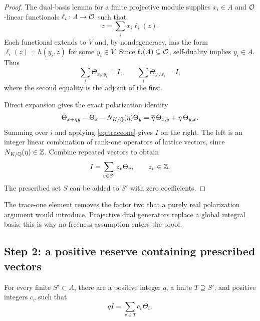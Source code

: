 \begin{proof}
The dual-basis lemma for a finite projective module supplies $x_i\in A$ and $\mathcal O$-linear functionals $\ell_i:A\to\mathcal O$ such that
\[
 z=\sum_i x_i\ell_i(z).
\]
Each functional extends to $V$ and, by nondegeneracy, has the form $\ell_i(z)=h(y_i,z)$ for some $y_i\in V$. Since $\ell_i(A)\subseteq\mathcal O$, self-duality implies $y_i\in A$. Thus
\[
 \sum_i\Theta_{x_i,y_i}=I,
 \qquad \sum_i\Theta_{y_i,x_i}=I,
\]
where the second equality is the adjoint of the first.

Direct expansion gives the exact polarization identity
\begin{equation}\label{eq:polarization}
 \Theta_{x+\eta y}-\Theta_x-N_{K/\mathbb Q}(\eta)\Theta_y
 =\overline\eta\,\Theta_{x,y}+\eta\,\Theta_{y,x}.
\end{equation}
Summing over $i$ and applying \eqref{eq:traceone} gives $I$ on the right. The left is an integer linear combination of rank-one operators of lattice vectors, since $N_{K/\mathbb Q}(\eta)\in\mathbb Z$. Combine repeated vectors to obtain
\begin{equation}\label{eq:signed-id}
 I=\sum_{v\in S'}z_v\Theta_v,\qquad z_v\in\mathbb Z.
\end{equation}
The prescribed set $S$ can be added to $S'$ with zero coefficients.
\end{proof}

The trace-one element removes the factor two that a purely real polarization argument would introduce. Projective dual generators replace a global integral basis; this is why no freeness assumption enters the proof.

\subsection{Step 2: a positive reserve containing prescribed vectors}

\begin{lemma}\label{lem:reserve}
For every finite $S'\subset A$, there are a positive integer $q$, a finite $T\supseteq S'$, and positive integers $c_v$ such that
\begin{equation}\label{eq:reserve}
 q I=\sum_{v\in T}c_v\Theta_v.
\end{equation}
\end{lemma}

